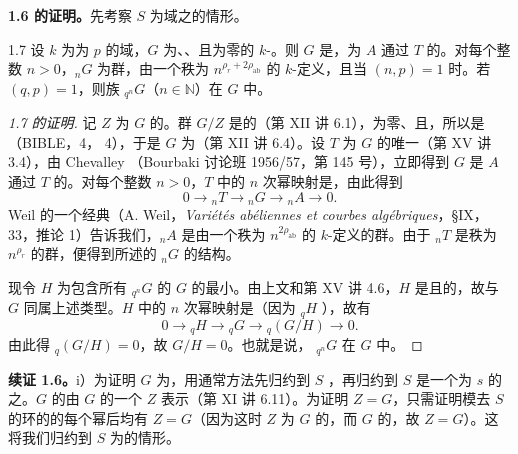 \textbf{1.6 的证明。}先考察 $S$ 为域之的情形。
\begin{SGAresult}{}{1.7}
设 $k$ 为为 $p$ 的域，$G$ 为、、且为零的 $k$-。则 $G$ 是，为 $A$ 通过 $T$ 的。对每个整数 $n>0$，${}_nG$ 为群，由一个秩为 $n^{\rho_r+2\rho_{\mathrm{ab}}}$ 的 $k$-定义，且当 $(n,p)=1$ 时。若 $(q,p)=1$，则族 ${}_{q^n}G$（$n\in\mathbb N$）在 $G$ 中。
\end{SGAresult}
\begin{proof}[1.7 的证明]
记 $Z$ 为 $G$ 的。群 $G/Z$ 是的（第 XII 讲 6.1），为零、且，所以是（BIBLE，4， 4），于是 $G$ 为（第 XII 讲 6.4）。设 $T$ 为 $G$ 的唯一（第 XV 讲 3.4），由 Chevalley （Bourbaki 讨论班 1956/57，第 145 号），立即得到 $G$ 是 $A$ 通过 $T$ 的。对每个整数 $n>0$，$T$ 中的 $n$ 次幂映射是，由此得到
\[0\longrightarrow {}_nT\longrightarrow {}_nG\longrightarrow {}_nA\longrightarrow0.\]
Weil 的一个经典（A. Weil，\textit{Variétés abéliennes et courbes algébriques}，§IX， 33，推论 1）告诉我们，${}_nA$ 是由一个秩为 $n^{2\rho_{\mathrm{ab}}}$ 的 $k$-定义的群。由于 ${}_nT$ 是秩为 $n^{\rho_r}$ 的群，便得到所述的 ${}_nG$ 的结构。

现令 $H$ 为包含所有 ${}_{q^n}G$ 的 $G$ 的最小。由上文和第 XV 讲 4.6，$H$ 是且的，故与 $G$ 同属上述类型。$H$ 中的 $n$ 次幂映射是（因为 ${}_qH$ ），故有
\[0\longrightarrow {}_qH\longrightarrow {}_qG\longrightarrow {}_q(G/H)\longrightarrow0.\]
由此得 ${}_q(G/H)=0$，故 $G/H=0$。也就是说， ${}_{q^n}G$ 在 $G$ 中。
\end{proof}
\textbf{续证 1.6。}i）为证明 $G$ 为，用通常方法先归约到 $S$ ，再归约到 $S$ 是一个为 $s$ 的之。$G$ 的由 $G$ 的一个 $Z$ 表示（第 XI 讲 6.11）。为证明 $Z=G$，只需证明模去 $S$ 的环的的每个幂后均有 $Z=G$（因为这时 $Z$ 为 $G$ 的，而 $G$ 的，故 $Z=G$）。这将我们归约到 $S$ 为的情形。
